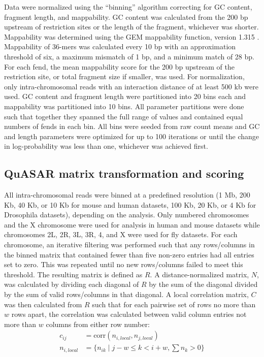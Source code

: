 Data were normalized using the ``binning'' algorithm correcting for GC content, fragment length, and mappability. GC content was calculated from the 200 bp upstream of restriction sites or the length of the fragment, whichever was shorter. Mappability was determined using the GEM mappability function, version 1.315 \cite{koehler_uniqueome:_2011}. Mappability of 36-mers was calculated every 10 bp with an approximation threshold of six, a maximum mismatch of 1 bp, and a minimum match of 28 bp. For each fend, the mean mappability score for the 200 bp upstream of the restriction site, or total fragment size if smaller, was used. For normalization, only intra-chromosomal reads with an interaction distance of at least 500 kb were used. GC content and fragment length were partitioned into 20 bins each and mappability was partitioned into 10 bins. All parameter partitions were done such that together they spanned the full range of values and contained equal numbers of fends in each bin. All bins were seeded from raw count means and GC and length parameters were optimized for up to 100 iterations or until the change in log-probability was less than one, whichever was achieved first.

\subsection{QuASAR matrix transformation and scoring}

All intra-chromosomal reads were binned at a predefined resolution (1 Mb, 200 Kb, 40 Kb, or 10 Kb for mouse and human datasets, 100 Kb, 20 Kb, or 4 Kb for Drosophila datasets), depending on the analysis. Only numbered chromosomes and the X chromosome were used for analysis in human and mouse datasets while chromosomes 2L, 2R, 3L, 3R, 4, and X were used for fly datasets. For each chromosome, an iterative filtering was performed such that any rows/columns in the binned matrix that contained fewer than five non-zero entries had all entries set to zero. This was repeated until no new rows/columns failed to meet this threshold. The resulting matrix is defined as $R$. A distance-normalized matrix, $N$, was calculated by dividing each diagonal of $R$ by the sum of the diagonal divided by the sum of valid rows/columns in that diagonal. A local correlation matrix, $C$ was then calculated from $R$ such that for each pairwise set of rows no more than $w$ rows apart, the correlation was calculated between valid column entries not more than $w$ columns from either row number:
\begin{align*}
  c_{ij} &= \text{corr}(n_{i,local},n_{j,local}) \\
  n_{i,local} &= \{ n_{ik} \mid j-w \leq k < i+w, \sum n_k > 0 \}
\end{align*}
  
